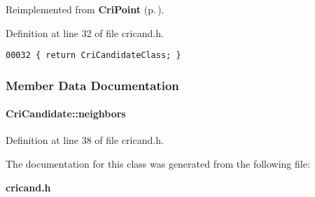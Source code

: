 Reimplemented from {\bf Cri\-Point} {\rm (p.\,\pageref{CriPoint_a3})}.

Definition at line 32 of file cricand.h.\small\begin{verbatim}00032 { return CriCandidateClass; }
\end{verbatim}\normalsize 


\subsubsection{Member Data Documentation}
\label{CriCandidate_m0}
\paragraph{ Cri\-Candidate::neighbors}\hfill



Definition at line 38 of file cricand.h.

The documentation for this class was generated from the following file:\begin{CompactItemize}
\item 
{\bf cricand.h}\end{CompactItemize}
